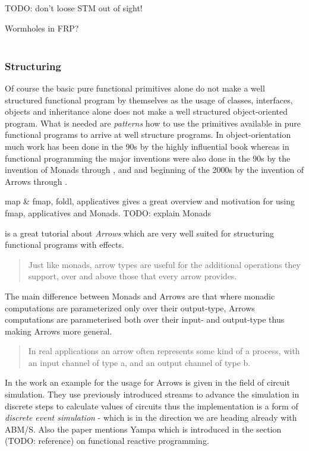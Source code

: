 TODO: don't loose STM out of sight!

Wormholes in FRP? \\
\\

\subsubsection{Structuring}
Of course the basic pure functional primitives alone do not make a well structured functional program by themselves as the usage of classes, interfaces, objects and inheritance alone does not make a well structured object-oriented program. What is needed are \textit{patterns} how to use the primitives available in pure functional programs to arrive at well structure programs. In object-orientation much work has been done in the 90s by the highly influential book \cite{gamma_design_1994} whereas in functional programming the major inventions were also done in the 90s by the invention of Monads through \cite{Moggi1989}, \cite{Wadler1990} and \cite{Wadler1995} and beginning of the 2000s by the invention of Arrows through \cite{Hughes2000}.


map \& fmap, foldl, applicatives
\cite{hutton_programming_2007} gives a great overview and motivation for using fmap, applicatives and Monads. TODO: explain Monads

\cite{Hughes2004} is a great tutorial about \textit{Arrows} which are very well suited for structuring functional programs with effects.

\begin{quote}
Just like monads, arrow types are useful for the additional operations they support, over and above those that every arrow provides.
\end{quote}

The main difference between Monads and Arrows are that where monadic computations are parameterized only over their output-type, Arrows computations are parameterised both over their input- and output-type thus making Arrows more general.

\begin{quote}
In real applications an arrow often represents some kind of a process, with an input channel of type a, and an output channel of type b.
\end{quote}

In the work \cite{Hughes2004} an example for the usage for Arrows is given in the field of circuit simulation. They use previously introduced streams to advance the simulation in discrete steps to calculate values of circuits thus the implementation is a form of \textit{discrete event simulation} - which is in the direction we are heading already with ABM/S. Also the paper mentions Yampa which is introduced in the section (TODO: reference) on functional reactive programming.


